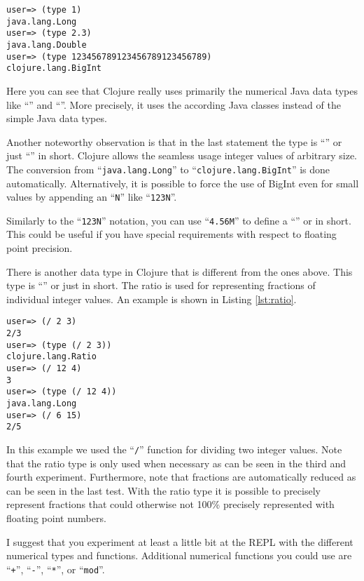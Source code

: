 \begin{lstlisting}[label=lst:numeric_types, caption=Types of Numeric Values]
user=> (type 1)
java.lang.Long
user=> (type 2.3)
java.lang.Double
user=> (type 123456789123456789123456789)
clojure.lang.BigInt
\end{lstlisting}

Here you can see that Clojure really uses primarily the numerical Java data types like ``'' and ``''.
More precisely, it uses the according Java classes instead of the simple Java data types.

Another noteworthy observation is that in the last statement the type is ``'' or just ``'' in short.
Clojure allows the seamless usage integer values of arbitrary size.
The conversion from ``\texttt{java.lang.Long}'' to ``\texttt{clojure.lang.BigInt}'' is done automatically.
Alternatively, it is possible to force the use of BigInt even for small values by appending an ``\texttt{N}'' like ``\texttt{123N}''.

Similarly to the ``\texttt{123N}'' notation, you can use ``\texttt{4.56M}'' to define a ``'' or  in short.
This could be useful if you have special requirements with respect to floating point precision.

There is another data type in Clojure that is different from the ones above.
This type is ``'' or just  in short.
The ratio is used for representing fractions of individual integer values.
An example is shown in Listing \vref{lst:ratio}.

\begin{lstlisting}[label=lst:ratio, caption=Ratio Data Type]
user=> (/ 2 3)
2/3
user=> (type (/ 2 3))
clojure.lang.Ratio
user=> (/ 12 4)
3
user=> (type (/ 12 4))
java.lang.Long
user=> (/ 6 15)
2/5
\end{lstlisting}

In this example we used the ``\texttt{/}'' function for dividing two integer values.
Note that the ratio type is only used when necessary as can be seen in the third and fourth experiment.
Furthermore, note that fractions are automatically reduced as can be seen in the last test.
With the ratio type it is possible to precisely represent fractions that could otherwise not 100\% precisely represented with floating point numbers.

I suggest that you experiment at least a little bit at the REPL with the different numerical types and functions.
Additional numerical functions you could use are ``\texttt{+}'', ``\texttt{-}'', ``\texttt{*}'', or ``\texttt{mod}''.

